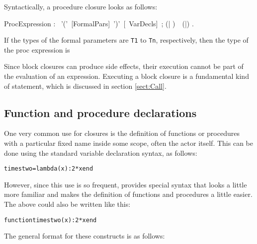 Syntactically, a procedure closure looks as follows:


\bgr
ProcExpression : \kwProc~'('~[FormalPars]~')'~[\kwVar~VarDecls]~;
      (\kwDo | \kwBegin)~~(\kwEnd|\kwEndProc) .
\egr

If the types of the formal parameters are {\tt T1} to {\tt Tn},
respectively, then the type of the
proc  expression is \\
\exindent{\tt [T1, ..., Tn -->]}



Since block
closures can produce side effects, their execution cannot be part of
the evaluation of an expression. Executing a block closure is a
fundamental kind of statement, which is discussed in section
\ref{sect:Call}.



\subsection{Function and procedure declarations}\label{sect:FunProcDecl}


One very common use for closures is the definition of functions or
procedures with a particular fixed name inside some scope, often the
actor itself. This can be done using the standard variable declaration
syntax, as follows:
\begin{alltt}
  timestwo = lambda(x) : 2 * x end
\end{alltt}

However, since this use is so frequent, \Cal provides special syntax
that looks a little more familiar and makes the definition of
functions and procedures a little easier. The above could also be
written like this:
\begin{alltt}
  function timestwo (x) : 2 * x end
\end{alltt}

The general format for these constructs is as follows:

